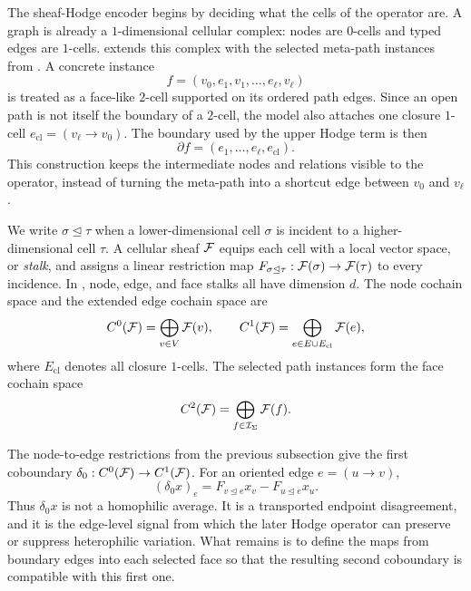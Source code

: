 The sheaf-Hodge encoder begins by deciding what the cells of the operator are.  A graph is already
a \(1\)-dimensional cellular complex: nodes are \(0\)-cells and typed edges are \(1\)-cells.
\method{} extends this complex with the selected meta-path instances from \ampss{}.  A concrete
instance
\[
  f=(v_0,e_1,v_1,\ldots,e_\ell,v_\ell)
\]
is treated as a face-like \(2\)-cell supported on its ordered path edges.  Since an open path is not
itself the boundary of a \(2\)-cell, the model also attaches one closure \(1\)-cell
\(e_{\mathrm{cl}}=(v_\ell\rightarrow v_0)\).  The boundary used by the upper Hodge term is then
\[
  \partial f=(e_1,\ldots,e_\ell,e_{\mathrm{cl}}).
\]
This construction keeps the intermediate nodes and relations visible to the operator, instead of
turning the meta-path into a shortcut edge between \(v_0\) and \(v_\ell\).

We write \(\sigma\unlhd\tau\) when a lower-dimensional cell \(\sigma\) is incident to a
higher-dimensional cell \(\tau\).  A cellular sheaf \(\mathcal{F}\) equips each cell with a local vector
space, or \emph{stalk}, and assigns a linear restriction map
\(F_{\sigma\unlhd\tau}:\mathcal{F}(\sigma)\rightarrow\mathcal{F}(\tau)\) to every incidence.  In \method{}, node,
edge, and face stalks all have dimension \(d\).  The node cochain space and the extended edge
cochain space are
\begin{equation}
  C^0(\mathcal{F})=\bigoplus_{v\in V}\mathcal{F}(v),
  \qquad
  C^1(\mathcal{F})=\bigoplus_{e\in E\cup E_{\mathrm{cl}}}\mathcal{F}(e),
\end{equation}
where \(E_{\mathrm{cl}}\) denotes all closure \(1\)-cells.  The selected path instances form the
face cochain space
\begin{equation}
  C^2(\mathcal{F})=\bigoplus_{f\in\mathcal{I}_{\Sigma}}\mathcal{F}(f).
\end{equation}

The node-to-edge restrictions from the previous subsection give the first coboundary
\(\delta_0:C^0(\mathcal{F})\rightarrow C^1(\mathcal{F})\).  For an oriented edge \(e=(u\rightarrow v)\),
\begin{equation}
  (\delta_0x)_e
  =
  F_{v\unlhd e}x_v-F_{u\unlhd e}x_u .
  \label{eq:background-delta0}
\end{equation}
Thus \(\delta_0x\) is not a homophilic average.  It is a transported endpoint disagreement, and it
is the edge-level signal from which the later Hodge operator can preserve or suppress
heterophilic variation.  What remains is to define the maps from boundary edges into each selected
face so that the resulting second coboundary is compatible with this first one.

